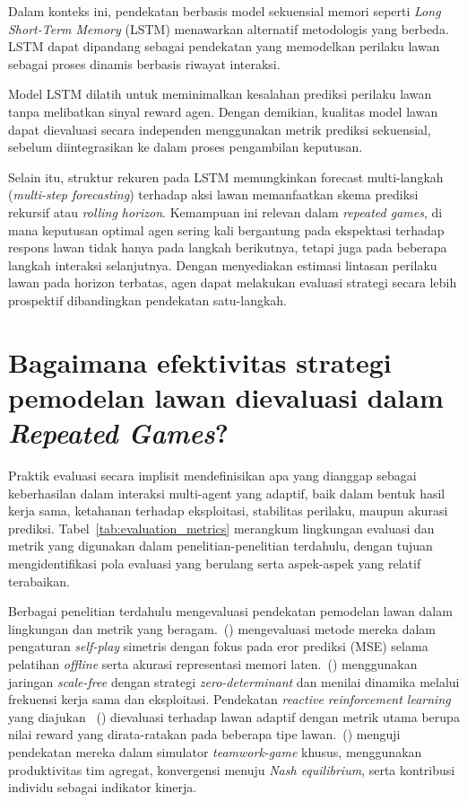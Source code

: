 Dalam konteks ini, pendekatan berbasis model sekuensial memori seperti \textit{Long Short-Term Memory} (LSTM) menawarkan alternatif metodologis yang berbeda. LSTM dapat dipandang sebagai pendekatan yang memodelkan perilaku lawan sebagai proses dinamis berbasis riwayat interaksi. 

Model LSTM dilatih untuk meminimalkan kesalahan prediksi perilaku lawan tanpa melibatkan sinyal reward agen. Dengan demikian, kualitas model lawan dapat dievaluasi secara independen menggunakan metrik prediksi sekuensial, sebelum diintegrasikan ke dalam proses pengambilan keputusan.

Selain itu, struktur rekuren pada LSTM memungkinkan forecast multi-langkah (\textit{multi-step forecasting}) terhadap aksi lawan memanfaatkan skema prediksi rekursif atau \textit{rolling horizon}. Kemampuan ini relevan dalam \textit{repeated games}, di mana keputusan optimal agen sering kali bergantung pada ekspektasi terhadap respons lawan tidak hanya pada langkah berikutnya, tetapi juga pada beberapa langkah interaksi selanjutnya. Dengan menyediakan estimasi lintasan perilaku lawan pada horizon terbatas, agen dapat melakukan evaluasi strategi secara lebih prospektif dibandingkan pendekatan satu-langkah.

\section{Bagaimana efektivitas strategi pemodelan lawan dievaluasi dalam \textit{Repeated Games}?}

Praktik evaluasi secara implisit mendefinisikan apa yang dianggap sebagai keberhasilan dalam interaksi multi-agent yang adaptif, baik dalam bentuk hasil kerja sama, ketahanan terhadap eksploitasi, stabilitas perilaku, maupun akurasi prediksi. Tabel~\ref{tab:evaluation_metrics} merangkum lingkungan evaluasi dan metrik yang digunakan dalam penelitian-penelitian terdahulu, dengan tujuan mengidentifikasi pola evaluasi yang berulang serta aspek-aspek yang relatif terabaikan.

Berbagai penelitian terdahulu mengevaluasi pendekatan pemodelan lawan dalam lingkungan dan metrik yang beragam.~(\cite{qiao_o2m_2024}) mengevaluasi metode mereka dalam pengaturan \textit{self-play} simetris dengan fokus pada eror prediksi (MSE) selama pelatihan \textit{offline} serta akurasi representasi memori laten.~(\cite{zhu_evolutionary_2025}) menggunakan jaringan \textit{scale-free} dengan strategi \textit{zero-determinant} dan menilai dinamika melalui frekuensi kerja sama dan eksploitasi. Pendekatan \textit{reactive reinforcement learning} yang diajukan ~(\cite{lv_inducing_2023}) dievaluasi terhadap lawan adaptif dengan metrik utama berupa nilai reward yang dirata-ratakan pada beberapa tipe lawan.~(\cite{gomez_grounded_2025}) menguji pendekatan mereka dalam simulator \textit{teamwork-game} khusus, menggunakan produktivitas tim agregat, konvergensi menuju \textit{Nash equilibrium}, serta kontribusi individu sebagai indikator kinerja.

